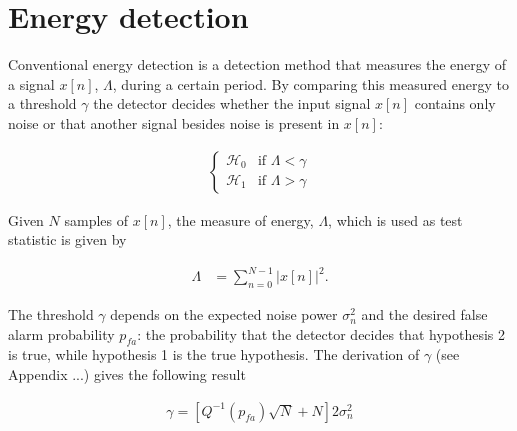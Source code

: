 \documentclass[a4paper, openany, oneside]{memoir}
\begin{document}

\section{Energy detection}
Conventional energy detection is a detection method that measures the energy of a signal $x[n]$, $\Lambda$, during a certain period. By comparing this measured energy to a threshold $\gamma$ the detector decides whether the input signal $x[n]$ contains only noise or that another signal besides noise is present in $x[n]$:

\begin{align*}
	\begin{cases}
		\mathcal{H}_0 & \text{if } \Lambda < \gamma \\
		\mathcal{H}_1 & \text{if } \Lambda > \gamma
	\end{cases}
\end{align*}
 
Given $N$ samples of $x[n]$, the measure of energy, $\Lambda$, which is used as test statistic is given by 

\begin{align}\label{eq:test_ed}
	\Lambda &= \sum_{n=0}^{N-1} |x[n]|^2.
\end{align}

The threshold $\gamma$ depends on the expected noise power $\sigma_n^2$ and the desired false alarm probability $p_{fa}$: the probability that the detector decides that hypothesis 2 is true, while hypothesis 1 is the true hypothesis. The derivation of $\gamma$ (see Appendix ...) gives the following result

\begin{align*}
\gamma = \left[Q^{-1}(p_{fa})\sqrt{N} + N\right]2\sigma_n^2
\end{align*}
\end{document}
